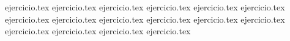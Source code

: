 \vspace{0.5cm}
\begin{enumerate}
    \setcounter{enumi}{24}
    {ejercicio.tex}
{ejercicio.tex}
{ejercicio.tex}
{ejercicio.tex}
{ejercicio.tex}
{ejercicio.tex}
{ejercicio.tex}
{ejercicio.tex}
{ejercicio.tex}
{ejercicio.tex}
{ejercicio.tex}
{ejercicio.tex}
{ejercicio.tex}
{ejercicio.tex}
{ejercicio.tex}
{ejercicio.tex}
\end{enumerate}

